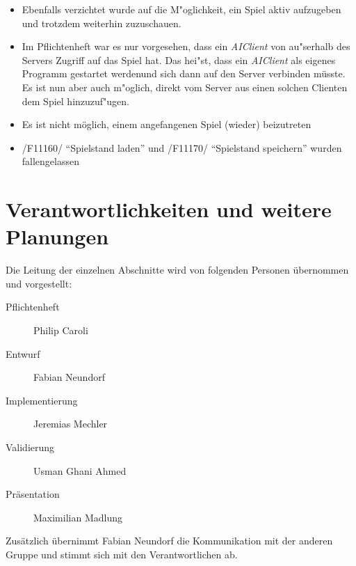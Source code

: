 \documentclass[a4paper,10pt]{article}
\begin{document}
\begin{itemize}
\item Ebenfalls verzichtet wurde auf die M"oglichkeit, ein Spiel aktiv aufzugeben und trotzdem weiterhin zuzuschauen.
\item Im Pflichtenheft war es nur vorgesehen, dass ein \textit{AIClient} von au"serhalb des Servers Zugriff auf das Spiel hat. Das hei"st, dass ein \textit{AIClient} als eigenes Programm gestartet werdenund sich dann auf den Server verbinden müsste. Es ist nun aber auch m"oglich, direkt vom Server aus einen solchen Clienten dem Spiel hinzuzuf"ugen.
\item Es ist nicht möglich, einem angefangenen Spiel (wieder) beizutreten
\item /F11160/ "`Spielstand laden"' und /F11170/ "`Spielstand speichern"' wurden fallengelassen 
\end{itemize}
\section{Verantwortlichkeiten und weitere Planungen}
Die Leitung der einzelnen Abschnitte wird von folgenden Personen übernommen und vorgestellt:
\begin{description}
\item[Pflichtenheft] Philip Caroli
\item[Entwurf] Fabian Neundorf
\item[Implementierung] Jeremias Mechler
\item[Validierung] Usman Ghani Ahmed
\item[Präsentation] Maximilian Madlung
\end{description}
Zusätzlich übernimmt Fabian Neundorf die Kommunikation mit der anderen Gruppe und stimmt sich mit den Verantwortlichen ab.
\end{document}
